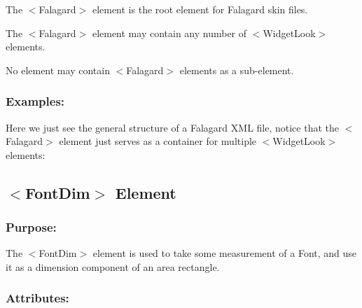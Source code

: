 \begin{DoxyItemize}
\item The {\ttfamily $<$Falagard$>$} element is the root element for Falagard skin files. 
\item The {\ttfamily $<$Falagard$>$} element may contain any number of {\ttfamily $<$Widget\+Look$>$} elements. 
\item No element may contain {\ttfamily $<$Falagard$>$} elements as a sub-\/element. 
\end{DoxyItemize}\hypertarget{fal_element_ref_fal_elem_ref_sec_11_4}{}\subsubsection{Examples\+:}\label{fal_element_ref_fal_elem_ref_sec_11_4}
Here we just see the general structure of a Falagard X\+ML file, notice that the {\ttfamily $<$Falagard$>$} element just serves as a container for multiple {\ttfamily $<$Widget\+Look$>$} elements\+: 
\begin{DoxyCode}{0}
\end{DoxyCode}
\hypertarget{fal_element_ref_fal_elem_ref_sec_12}{}\subsection{$<$\+Font\+Dim$>$ Element}\label{fal_element_ref_fal_elem_ref_sec_12}
\hypertarget{fal_element_ref_fal_elem_ref_sec_12_1}{}\subsubsection{Purpose\+:}\label{fal_element_ref_fal_elem_ref_sec_12_1}
The {\ttfamily $<$Font\+Dim$>$} element is used to take some measurement of a Font, and use it as a dimension component of an area rectangle.\hypertarget{fal_element_ref_fal_elem_ref_sec_12_2}{}\subsubsection{Attributes\+:}\label{fal_element_ref_fal_elem_ref_sec_12_2}
